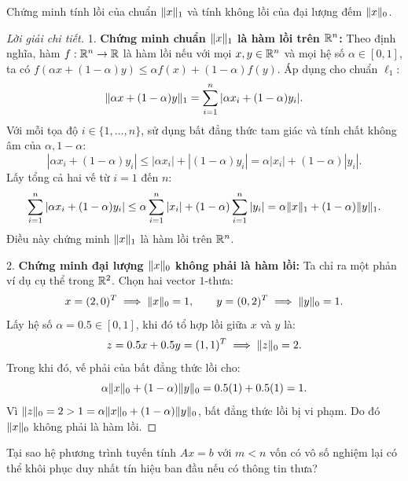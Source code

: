 \begin{exercise}
Chứng minh tính lồi của chuẩn $\|x\|_1$ và tính không lồi của đại lượng đếm $\|x\|_0$.
\end{exercise}

\begin{proof}[Lời giải chi tiết]
1. \textbf{Chứng minh chuẩn $\|x\|_1$ là hàm lồi trên $\mathbb{R}^n$:}
Theo định nghĩa, hàm $f : \mathbb{R}^n \to \mathbb{R}$ là hàm lồi nếu với mọi $x, y \in \mathbb{R}^n$ và mọi hệ số $\alpha \in [0, 1]$, ta có $f(\alpha x + (1 - \alpha) y) \le \alpha f(x) + (1 - \alpha) f(y)$.
Áp dụng cho chuẩn $\ell_1$:
\[
\|\alpha x + (1 - \alpha) y\|_1 = \sum_{i=1}^n |\alpha x_i + (1 - \alpha) y_i|.
\]
Với mỗi tọa độ $i \in \{1, \dots, n\}$, sử dụng bất đẳng thức tam giác và tính chất không âm của $\alpha, 1 - \alpha$:
\[
|\alpha x_i + (1 - \alpha) y_i| \le |\alpha x_i| + |(1 - \alpha) y_i| = \alpha |x_i| + (1 - \alpha) |y_i|.
\]
Lấy tổng cả hai vế từ $i = 1$ đến $n$:
\[
\sum_{i=1}^n |\alpha x_i + (1 - \alpha) y_i| \le \alpha \sum_{i=1}^n |x_i| + (1 - \alpha) \sum_{i=1}^n |y_i| = \alpha \|x\|_1 + (1 - \alpha) \|y\|_1.
\]
Điều này chứng minh $\|x\|_1$ là hàm lồi trên $\mathbb{R}^n$.

2. \textbf{Chứng minh đại lượng $\|x\|_0$ không phải là hàm lồi:}
Ta chỉ ra một phản ví dụ cụ thể trong $\mathbb{R}^2$. Chọn hai vector $1$-thưa:
\[
x = (2, 0)^T \implies \|x\|_0 = 1, \qquad y = (0, 2)^T \implies \|y\|_0 = 1.
\]
Lấy hệ số $\alpha = 0.5 \in [0, 1]$, khi đó tổ hợp lồi giữa $x$ và $y$ là:
\[
z = 0.5 x + 0.5 y = (1, 1)^T \implies \|z\|_0 = 2.
\]
Trong khi đó, vế phải của bất đẳng thức lồi cho:
\[
\alpha \|x\|_0 + (1 - \alpha) \|y\|_0 = 0.5(1) + 0.5(1) = 1.
\]
Vì $\|z\|_0 = 2 > 1 = \alpha \|x\|_0 + (1 - \alpha) \|y\|_0$, bất đẳng thức lồi bị vi phạm. Do đó $\|x\|_0$ không phải là hàm lồi.
\end{proof}

\begin{exercise}
Tại sao hệ phương trình tuyến tính $Ax = b$ với $m < n$ vốn có vô số nghiệm lại có thể khôi phục duy nhất tín hiệu ban đầu nếu có thông tin thưa?
\end{exercise}

